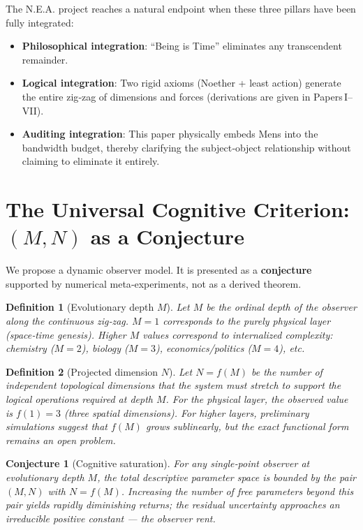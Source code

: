 \documentclass[12pt,a4paper]{article}
\newtheorem{conjecture}{Conjecture}[section]
\newtheorem{definition}{Definition}[section]
\begin{document}
The N.E.A. project reaches a natural endpoint when these three pillars have been fully integrated:
\begin{itemize}
    \item \textbf{Philosophical integration}: “Being is Time” eliminates any transcendent remainder.
    \item \textbf{Logical integration}: Two rigid axioms (Noether + least action) generate the entire zig‑zag of dimensions and forces (derivations are given in Papers I–VII).
    \item \textbf{Auditing integration}: This paper physically embeds Mens into the bandwidth budget, thereby clarifying the subject‑object relationship without claiming to eliminate it entirely.
\end{itemize}

\section{The Universal Cognitive Criterion: \((M, N)\) as a Conjecture}

We propose a dynamic observer model. It is presented as a \textbf{conjecture} supported by numerical meta‑experiments, not as a derived theorem.

\begin{definition}[Evolutionary depth \(M\)]
Let \(M\) be the ordinal depth of the observer along the continuous zig‑zag. \(M = 1\) corresponds to the purely physical layer (space‑time genesis). Higher \(M\) values correspond to internalized complexity: chemistry (\(M=2\)), biology (\(M=3\)), economics/politics (\(M=4\)), etc.
\end{definition}

\begin{definition}[Projected dimension \(N\)]
Let \(N = f(M)\) be the number of independent topological dimensions that the system must stretch to support the logical operations required at depth \(M\). For the physical layer, the observed value is \(f(1) = 3\) (three spatial dimensions). For higher layers, preliminary simulations suggest that \(f(M)\) grows sublinearly, but the exact functional form remains an open problem.
\end{definition}

\begin{conjecture}[Cognitive saturation]
For any single‑point observer at evolutionary depth \(M\), the total descriptive parameter space is bounded by the pair \((M, N)\) with \(N = f(M)\). Increasing the number of free parameters beyond this pair yields rapidly diminishing returns; the residual uncertainty approaches an irreducible positive constant — the observer rent.
\end{conjecture}
\end{document}
